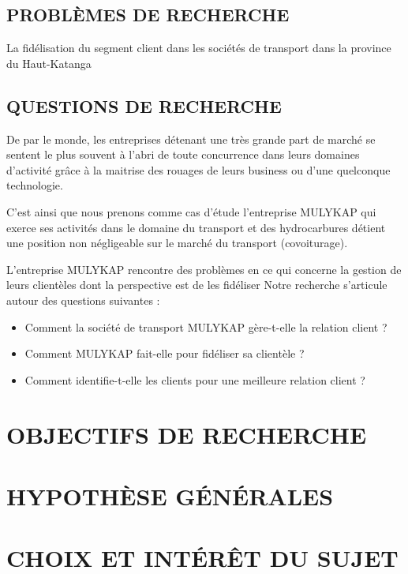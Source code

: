 \documentclass[a4paper,12pt,oneside]{book}
\begin{document}
\subsection[Problèmes de recherche]{PROBLÈMES DE RECHERCHE}
La fidélisation du segment client dans les sociétés de transport
dans la province du Haut-Katanga

\subsection[Questions de recherche]{QUESTIONS DE RECHERCHE}
De par le monde, les entreprises détenant une très grande part de marché
se sentent le plus souvent à l’abri de toute concurrence dans leurs domaines d’activité
grâce à la maitrise des rouages de leurs business ou
d’une quelconque technologie. \cite*{Rouviere2010} 

C’est ainsi que nous prenons comme cas d’étude l’entreprise MULYKAP qui exerce ses activités dans le domaine 
du transport et des hydrocarbures détient
une position non négligeable sur le marché du transport (covoiturage). \cite{Rouviere2010}

L’entreprise MULYKAP rencontre des problèmes en ce qui concerne
la gestion de leurs clientèles dont la perspective est de les 
fidéliser 
Notre recherche s’articule autour des questions suivantes : 
\begin{itemize}
    \item Comment la société de transport MULYKAP gère-t-elle
    la relation client ?
    \item Comment MULYKAP fait-elle pour fidéliser sa clientèle ?
    \item Comment identifie-t-elle les clients pour une
    meilleure relation client ?
\end{itemize}

\section[Objectifs de recherche]{OBJECTIFS DE RECHERCHE}

\section[Hyposthèses générales]{HYPOTHÈSE GÉNÉRALES}

\section[Choix et interet du sujet]{CHOIX ET INTÉRÊT DU SUJET}
\end{document}
